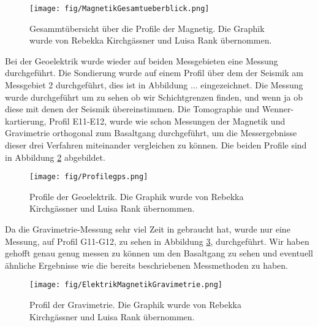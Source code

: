 \begin{figure}
 \centering
 \texttt{[image: fig/MagnetikGesamtueberblick.png]}
 \caption[Gesammtübersicht über die Profile der Magnetig]{Gesammtübersicht über die Profile der Magnetig. Die Graphik wurde von Rebekka Kirchgässner und Luisa Rank übernommen.}
 \label{abb:Magnetik}
\end{figure}

Bei der Geoelektrik wurde wieder auf beiden Messgebieten eine Messung durchgeführt. Die Sondierung wurde auf einem Profil über dem der Seismik am Messgebiet 2 durchgeführt, dies ist in 
Abbildung ... eingezeichnet. Die Messung wurde durchgeführt um zu sehen ob wir Schichtgrenzen finden, und wenn ja ob diese mit denen der Seismik übereinstimmen.
Die Tomographie und Wenner-kartierung, Profil E11-E12, wurde wie schon Messungen der Magnetik und Gravimetrie orthogonal zum Basaltgang durchgeführt, um die Messergebnisse dieser drei Verfahren
miteinander vergleichen zu können. Die beiden Profile sind in Abbildung \ref{abb:Geoelek} abgebildet.

\begin{figure}
 \centering
 \texttt{[image: fig/Profilegps.png]}
 \caption[Profile der Geoelktrik]{Profile der Geoelektrik. Die Graphik wurde von Rebekka Kirchgässner und Luisa Rank übernommen.}
 \label{abb:Geoelek}
\end{figure}

Da die Gravimetrie-Messung sehr viel Zeit in gebraucht hat, wurde nur eine Messung, auf Profil G11-G12, zu sehen in Abbildung \ref{abb:Geoelek2}, durchgeführt. Wir haben gehofft genau genug
messen zu können um den Basaltgang zu sehen und eventuell ähnliche Ergebnisse wie die bereits beschriebenen Messmethoden zu haben.

\begin{figure}
 \centering
 \texttt{[image: fig/ElektrikMagnetikGravimetrie.png]}
 \caption[Profil der Gravimetrie]{Profil der Gravimetrie. Die Graphik wurde von Rebekka Kirchgässner und Luisa Rank übernommen. }
 \label{abb:Geoelek2}
\end{figure}






